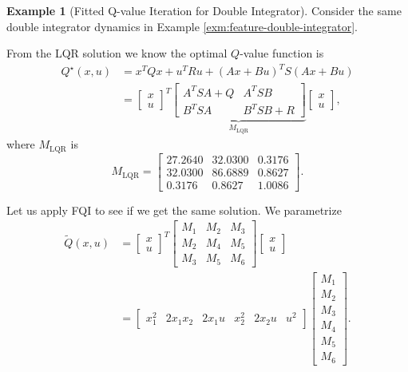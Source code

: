 \documentclass[
]{book}
\theoremstyle{definition}
\theoremstyle{definition}
\newtheorem{example}{Example}[chapter]
\theoremstyle{definition}
\theoremstyle{definition}
\theoremstyle{remark}
\begin{document}
\begin{example}[Fitted Q-value Iteration for Double Integrator]
\protect\hypertarget{exm:fqidoubleintegrator}{}\label{exm:fqidoubleintegrator}Consider the same double integrator dynamics in Example \ref{exm:feature-double-integrator}.

From the LQR solution we know the optimal \(Q\)-value function is
\begin{align}
Q^\star(x,u) &= x^T Q x + u^T R u + (Ax + Bu)^T S (Ax + Bu) \\
&= \begin{bmatrix} x \\ u \end{bmatrix}^T 
\underbrace{\begin{bmatrix} A^T S A + Q & A^T S B \\
B^T S A & B^T S B + R \end{bmatrix}}_{M_{\mathrm{LQR}}} \begin{bmatrix} x \\ u \end{bmatrix},
\end{align}
where \(M_{\mathrm{LQR}}\) is
\[
M_{\mathrm{LQR}} = \begin{bmatrix}
27.2640 & 32.0300 & 0.3176 \\
32.0300 & 86.6889 & 0.8627 \\
0.3176 & 0.8627 & 1.0086 
\end{bmatrix}.
\]

Let us apply FQI to see if we get the same solution. We parametrize
\begin{align}
\tilde{Q}(x,u) &= \begin{bmatrix} x \\ u \end{bmatrix}^T \begin{bmatrix}
M_1 & M_2 & M_3 \\
M_2 & M_4 & M_5 \\
M_3 & M_5 & M_6 
\end{bmatrix} \begin{bmatrix} x \\ u \end{bmatrix} \\
&= \begin{bmatrix} x_1^2 & 2 x_1 x_2 & 2x_1 u & x_2^2 & 2x_2 u & u^2 \end{bmatrix} \begin{bmatrix} M_1 \\ M_2 \\ M_3 \\ M_4 \\ M_5 \\ M_6 \end{bmatrix}.
\end{align}


\end{example}
\end{document}
